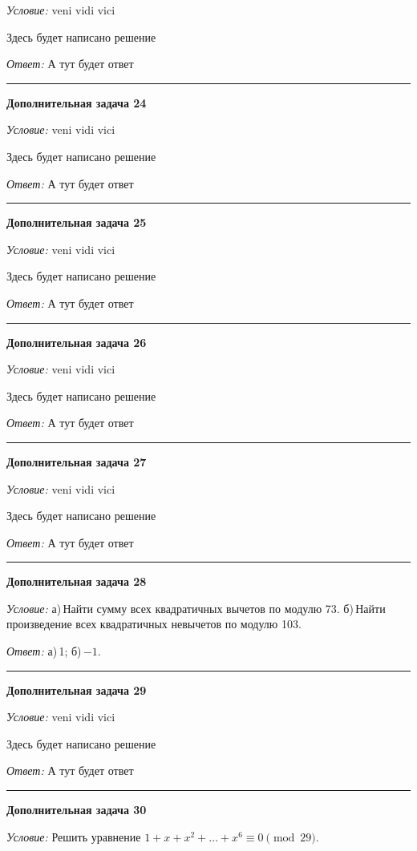 \documentclass[12pt,a4paper]{article}
\newcommand{\sbs}{\large \bfseries}
\newcommand{\rl}{\vspace{16pt} \hrule \vspace{8pt}}
\begin{document}
{\itshape Условие: } veni vidi vici

Здесь будет написано решение

{\itshape Ответ: } А тут будет ответ




\rl
{\sbs Дополнительная задача 24}

{\itshape Условие: } veni vidi vici

Здесь будет написано решение

{\itshape Ответ: } А тут будет ответ




\rl
{\sbs Дополнительная задача 25}

{\itshape Условие: } veni vidi vici

Здесь будет написано решение

{\itshape Ответ: } А тут будет ответ




\rl
{\sbs Дополнительная задача 26}

{\itshape Условие: } veni vidi vici

Здесь будет написано решение

{\itshape Ответ: } А тут будет ответ




\rl
{\sbs Дополнительная задача 27}

{\itshape Условие: } veni vidi vici

Здесь будет написано решение

{\itshape Ответ: } А тут будет ответ




\rl
{\sbs Дополнительная задача 28}

{\itshape Условие: } а)\,Найти сумму всех квадратичных вычетов по модулю 73. б)\,Найти произведение всех квадратичных невычетов по модулю 103.



{\itshape Ответ: } а)\,1; б)\,$-1$.




\rl
{\sbs Дополнительная задача 29}

{\itshape Условие: } veni vidi vici

Здесь будет написано решение

{\itshape Ответ: } А тут будет ответ




\rl
{\sbs Дополнительная задача 30}

{\itshape Условие: } Решить уравнение $1+x+x^2+\ldots+x^6\equiv 0\pmod{29}$.
\end{document}
